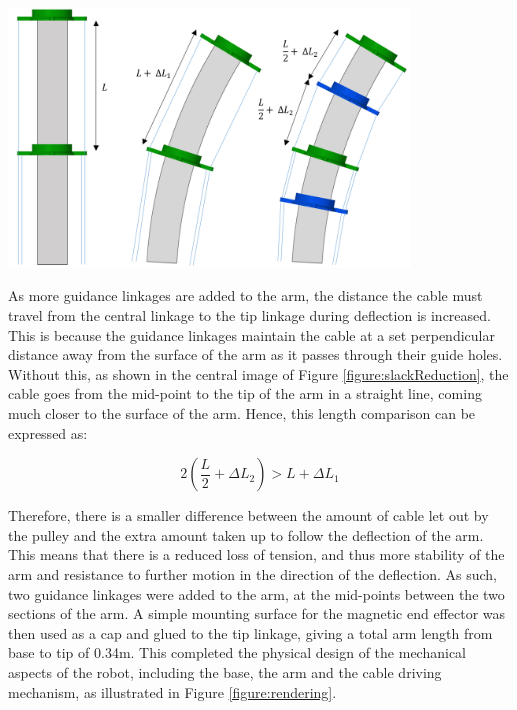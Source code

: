\documentclass[11pt]{article}
\begin{document}
\begin{center}
\includegraphics[width=0.8\textwidth]{images/slackReduction.png}
\label{figure:slackReduction}
\end{center}

As more guidance linkages are added to the arm, the distance the cable must travel from the central linkage to the tip linkage during deflection is increased. This is because the guidance linkages maintain the cable at a set perpendicular distance away from the surface of the arm as it passes through their guide holes. Without this, as shown in the central image of Figure \ref{figure:slackReduction}, the cable goes from the mid-point to the tip of the arm in a straight line, coming much closer to the surface of the arm. Hence, this length comparison can be expressed as:



\begin{equation}\label{equation:guidanceLength}
2(\frac{L}{2} + \Delta L_{2}) > L + \Delta L_{1}
\end{equation}

Therefore, there is a smaller difference between the amount of cable let out by the pulley and the extra amount taken up to follow the deflection of the arm. This means that there is a reduced loss of tension, and thus more stability of the arm and resistance to further motion in the direction of the deflection. As such, two guidance linkages were added to the arm, at the mid-points between the two sections of the arm. A simple mounting surface for the magnetic end effector was then used as a cap and glued to the tip linkage, giving a total arm length from base to tip of 0.34m. This completed the physical design of the mechanical aspects of the robot, including the base, the arm and the cable driving mechanism, as illustrated in Figure \ref{figure:rendering}.
\end{document}

